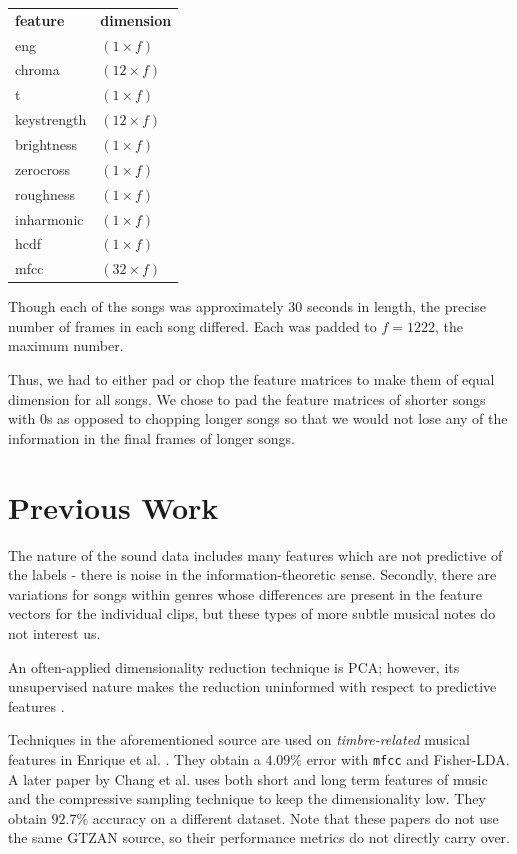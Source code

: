 \documentclass{article}
\begin{document}
\begin{center}
\begin{tabular}{ l | l }
  {\bf feature} & {\bf dimension}\\
  eng & $(1 \times f)$   \\
  chroma & $(12 \times f)$   \\
  t & $(1 \times f)$   \\
  keystrength & $(12 \times f)$   \\
  brightness & $(1 \times f)$   \\
  zerocross & $(1 \times f)$   \\
  roughness & $(1 \times f)$   \\
  inharmonic & $(1 \times f)$ \\
  hcdf & $(1 \times f)$  \\
  mfcc & $(32 \times f)$ \\
\end{tabular}
\end{center}

Though each of the songs was approximately 30 seconds in length, the precise number of frames in each song differed. Each was padded to $f = 1222$, the maximum number.

Thus, we had to either pad or chop the feature matrices to make them of equal dimension
for all songs.
We chose to pad the feature matrices of shorter songs with 0s as opposed to chopping longer songs
so that we would not lose any of the information in the final frames of longer songs.

\section{Previous Work}

The nature of the sound data includes many features which are not predictive of the labels - there is noise in the information-theoretic sense. Secondly, there are variations for songs within genres whose differences are present in the feature vectors for the individual clips, but these types of more subtle musical notes do not interest us.

An often-applied dimensionality reduction technique is PCA; however, its unsupervised nature makes the reduction uninformed with respect to predictive features \cite{WellingNote}.

Techniques in the aforementioned source are used on {\em timbre-related} musical features in Enrique et al. \cite{ERLGRR}. They obtain a $4.09\%$  error with \texttt{mfcc} and Fisher-LDA. A later paper by Chang et al. \cite{CJI10} uses both short and long term features of music and the compressive sampling technique to keep
the dimensionality low. They obtain $92.7\%$ accuracy on a different dataset. Note that these papers do not use the same GTZAN source, so their performance metrics do not directly carry over.
\end{document}
